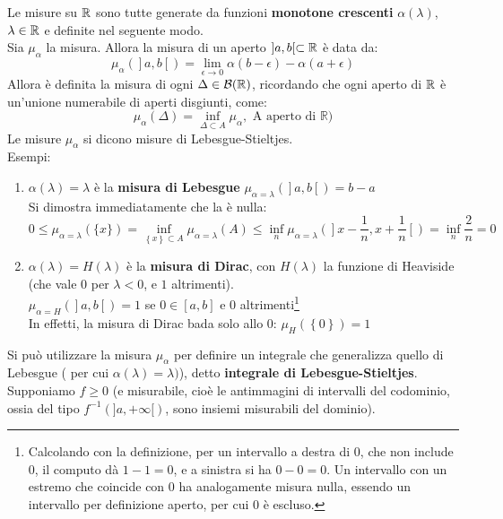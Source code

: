 \documentclass[FisicaTeorica.tex]{subfiles}
\begin{document}
Le misure  su $\mathbb{R}$ sono tutte generate da funzioni \textbf{monotone crescenti} $\alpha\left(\lambda\right)$, $\lambda \in \mathbb{R}$ e definite nel seguente modo.\\
Sia $\mu_\alpha$ la misura. Allora la misura di un aperto $]a,b[ \subset \mathbb{R}$ è data da:
\[ \mu_\alpha\left(\right]a,b\left[\right)=\lim_{\epsilon\rightarrow0} \alpha \left(b-\epsilon\right) - \alpha \left(a+\epsilon\right)\]
Allora è definita la misura di ogni $\Delta \in \mathcal{B}(\mathbb{R})$, ricordando che ogni aperto di $\mathbb{R}$ è un'unione numerabile di aperti disgiunti, come:
\[
\mu_\alpha\left(\Delta\right)=\inf_{\Delta\subset A}{\mu_\alpha,\text{\ A\ aperto\ di }\mathbb{R})}
\]
Le misure $\mu_\alpha$ si dicono misure di Lebesgue-Stieltjes.\\
Esempi:
\begin{enumerate}
    \item $\alpha \left(\lambda\right)=\lambda$ è la \textbf{misura di Lebesgue}
	$\mu_{\alpha=\lambda}\left(\right]a,b\left[\right)=b-a$\\
	Si dimostra immediatamente che la  è nulla:
	\[ 0\leq \mu_{\alpha=\lambda}\left(\{x\}\right)=\inf_{\left\{x\right\}\subset A}{\mu_{\alpha=\lambda}\left(A\right)\le\inf_n{\mu_{\alpha=\lambda}\left(\right]x-\frac{1}{n},x+\frac{1}{n}\left[\right)=\inf_n{\frac{2}{n}=0}}} \]
	\item $\alpha \left(\lambda\right)=H\left(\lambda\right)$ è la \textbf{misura di Dirac}, con $H(\lambda)$ la funzione di Heaviside (che vale $0$ per $\lambda <0$, e $1$ altrimenti).\\
	$\mu_{\alpha=H}\left(\right]a,b\left[\right)=1$ se $0\in[a,b]$ e $0$ altrimenti\footnote{Calcolando con la definizione, per un intervallo a destra di $0$, che non include $0$, il computo dà $1-1 = 0$, e a sinistra si ha $0-0 = 0$. Un intervallo con un estremo che coincide con $0$ ha analogamente misura nulla, essendo un intervallo per definizione aperto, per cui $0$ è escluso.}\\
	In effetti, la misura di Dirac bada solo allo $0$: $\mu_H\left(\left\{0\right\}\right)=1$
\end{enumerate}
Si può utilizzare la misura $\mu_\alpha$ per definire un integrale che generalizza quello di Lebesgue ( per cui $\alpha \left(\lambda\right)= \lambda)$), detto \textbf{integrale di Lebesgue-Stieltjes}.\\
Supponiamo $f\geq 0$ (e misurabile, cioè le antimmagini  di intervalli  del codominio, ossia del tipo $f^{-1}(]a,+\infty[)$, sono insiemi misurabili del dominio).\\
\end{document}
